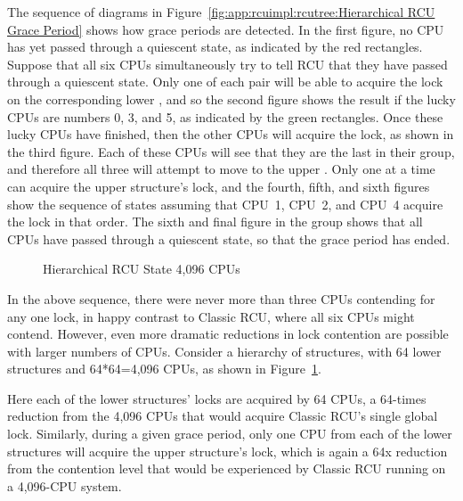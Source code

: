 The sequence of diagrams in
Figure~\ref{fig:app:rcuimpl:rcutree:Hierarchical RCU Grace Period}
shows how grace periods are detected.
In the first figure, no CPU has yet passed through a quiescent state,
as indicated by the red rectangles.
Suppose that all six CPUs simultaneously try to tell RCU that they have
passed through a quiescent state.
Only one of each pair will be able to acquire the lock on the
corresponding lower , and so the second figure
shows the result if the lucky CPUs are numbers 0, 3, and 5, as indicated
by the green rectangles.
Once these lucky CPUs have finished, then the other CPUs will acquire
the lock, as shown in the third figure.
Each of these CPUs will see that they are the last in their group,
and therefore all three will attempt to move to the upper
.
Only one at a time can acquire the upper  structure's
lock, and the fourth, fifth, and sixth figures show the sequence of
states assuming that CPU~1, CPU~2, and CPU~4 acquire
the lock in that order.
The sixth and final figure in the group shows that all CPUs have passed
through a quiescent state, so that the grace period has ended.

\begin{figure}[htb]
\centering
{}
\caption{Hierarchical RCU State 4,096 CPUs}
\label{fig:app:rcuimpl:rcutree:Hierarchical RCU State 4,096 CPUs}
\end{figure}

In the above sequence, there were never more than three CPUs
contending for any one lock, in happy contrast to Classic RCU,
where all six CPUs might contend.
However, even more dramatic reductions in lock contention are
possible with larger numbers of CPUs.
Consider a hierarchy of  structures, with
64 lower structures and 64*64=4,096 CPUs, as shown in
Figure~\ref{fig:app:rcuimpl:rcutree:Hierarchical RCU State 4,096 CPUs}.

Here each of the lower  structures' locks
are acquired by 64 CPUs, a 64-times reduction from the 4,096 CPUs
that would acquire Classic RCU's single global lock.
Similarly, during a given grace period, only one CPU from each of
the lower  structures will acquire the
upper  structure's lock, which is again
a 64x reduction from the contention level that would be experienced
by Classic RCU running on a 4,096-CPU system.

